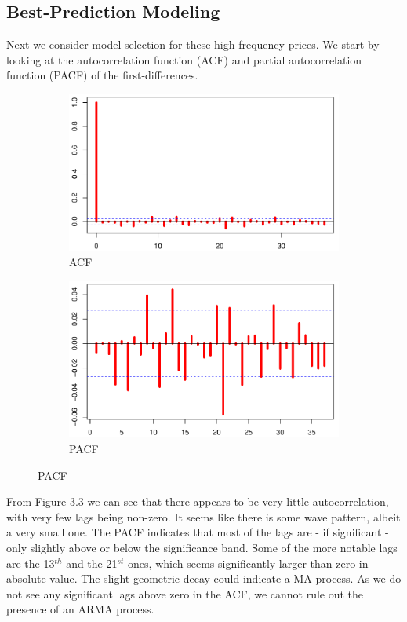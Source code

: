 \documentclass[a4paper]{article}
\theoremstyle{definition}
\begin{document}
\subsection{Best-Prediction Modeling}
Next we consider model selection for these high-frequency prices. We start by looking at the autocorrelation function (ACF) and partial autocorrelation function (PACF) of the first-differences. 
\begin{figure}[t]
     \centering
     \caption{Empirical (Partial) Autocorrelation Functions of the Gold Price FDs}
     \begin{subfigure}[t]{0.45\textwidth}
         \caption{ACF}        
         \includegraphics[width=\textwidth]{acfGOLDFD}
    \end{subfigure}
    \begin{subfigure}[t]{0.45\textwidth}
         \caption{PACF}
         \includegraphics[width=\textwidth]{pacfGOLDFD}
    \end{subfigure}
\end{figure}

From Figure 3.3 we can see that there appears to be very little autocorrelation, with very few lags being non-zero. It seems like there is some wave pattern, albeit a very small one. The PACF indicates that most of the lags are - if significant - only slightly above or below the significance band. Some of the more notable lags are the 13$^{th}$ and the 21$^{st}$ ones, which seems significantly larger than zero in absolute value. The slight geometric decay could indicate a MA process. As we do not see any significant lags above zero in the ACF, we cannot rule out the presence of an ARMA process.
\end{document}

